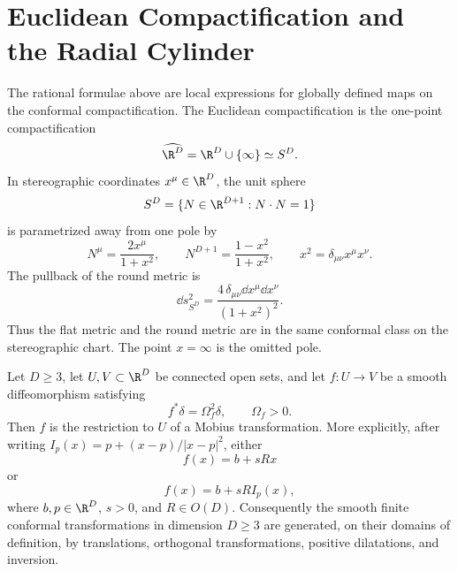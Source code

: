 \section{Euclidean Compactification and the Radial Cylinder}
\label{sec:euclidean-compactification-radial-cylinder}

\begin{definition}
\label{def:euclidean-conformal-compactification}
The rational formulae above are local expressions for globally defined maps
on the conformal compactification.  The Euclidean compactification is the
one-point compactification
\[
  \widehat{\R^D}=\R^D\cup\{\infty\}\simeq S^D .
\]
In stereographic coordinates \(x^\mu\in\R^D\), the unit sphere
\[
  S^D=\{N\in\R^{D+1}:N\cdot N=1\}
\]
is parametrized away from one pole by
\begin{equation}
  N^\mu=\frac{2x^\mu}{1+x^2},
  \qquad
  N^{D+1}=\frac{1-x^2}{1+x^2},
  \qquad
  x^2=\delta_{\mu\nu}x^\mu x^\nu .
  \label{eq:stereographic-sphere-coordinates}
\end{equation}
The pullback of the round metric is
\begin{equation}
  \dd s^2_{S^D}
  =
  \frac{4\,\delta_{\mu\nu}\dd x^\mu\dd x^\nu}{(1+x^2)^2}.
  \label{eq:stereographic-round-metric}
\end{equation}
Thus the flat metric and the round metric are in the same conformal class on
the stereographic chart.  The point \(x=\infty\) is the omitted pole.
\end{definition}

\begin{theorem}
\label{thm:finite-liouville-rigidity-d-ge-three}
Let \(D\ge3\), let \(U,V\subset\R^D\) be connected open sets, and let
\(f:U\to V\) be a smooth diffeomorphism satisfying
\[
  f^*\delta=\Omega_f^2\delta,
  \qquad \Omega_f>0 .
\]
Then \(f\) is the restriction to \(U\) of a Mobius transformation.  More
explicitly, after writing \(I_p(x)=p+(x-p)/|x-p|^2\), either
\[
  f(x)=b+sR x
\]
or
\[
  f(x)=b+sR I_p(x),
\]
where \(b,p\in\R^D\), \(s>0\), and \(R\in O(D)\).  Consequently the smooth
finite conformal transformations in dimension \(D\ge3\) are generated, on
their domains of definition, by translations, orthogonal transformations,
positive dilatations, and inversion.
\end{theorem}

